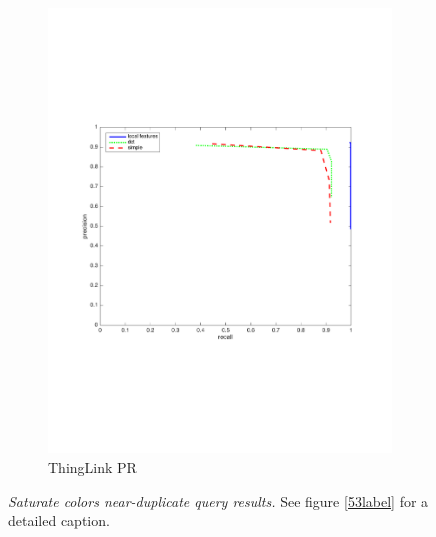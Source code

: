 \documentclass[english,12pt,a4paper,pdftex,elec,utf8, table]{aaltothesis}
\begin{document}
\begin{figure}[htb]
\begin{center}
\begin{subfigure}[b]{0.49\textwidth}
    \includegraphics[width=\textwidth]{figures/thinglink_SaturatecolorsPR.pdf}
    \caption{ThingLink PR}
    \label{Saturateprthinglink}
  \end{subfigure}
  \caption{\emph{Saturate colors near-duplicate query results.} See figure \ref{53label} for a detailed caption.\label{saturatelabel}}
  \end{center}
\end{figure}



\end{document}
